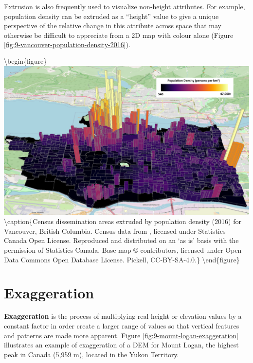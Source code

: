 \documentclass[
]{book}
\begin{document}
Extrusion is also frequently used to visualize non-height attributes. For example, population density can be extruded as a ``height'' value to give a unique perspective of the relative change in this attribute across space that may otherwise be difficult to appreciate from a 2D map with colour alone (Figure \ref{fig:9-vancouver-population-density-2016}).

\textbackslash begin\{figure\}
\includegraphics[width=0.75\linewidth]{images/09-vancouver-population-density-2016} \textbackslash caption\{Census dissemination areas extruded by population density (2016) for Vancouver, British Columbia. Census data from \citet{government_of_canada_focus_2017}, licensed under Statistics Canada Open License. Reproduced and distributed on an `as is' basis with the permission of Statistics Canada. Base map © \citet{openstreetmap_notitle_nodate} contributors, licensed under Open Data Commons Open Database License. Pickell, CC-BY-SA-4.0.\}\label{fig:9-vancouver-population-density-2016}
\textbackslash end\{figure\}

\hypertarget{exaggeration}{%
\section{Exaggeration}\label{exaggeration}}

\textbf{Exaggeration} is the process of multiplying real height or elevation values by a constant factor in order create a larger range of values so that vertical features and patterns are made more apparent. Figure \ref{fig:9-mount-logan-exaggeration} illustrates an example of exaggeration of a DEM for Mount Logan, the highest peak in Canada (5,959 m), located in the Yukon Territory.
\end{document}
